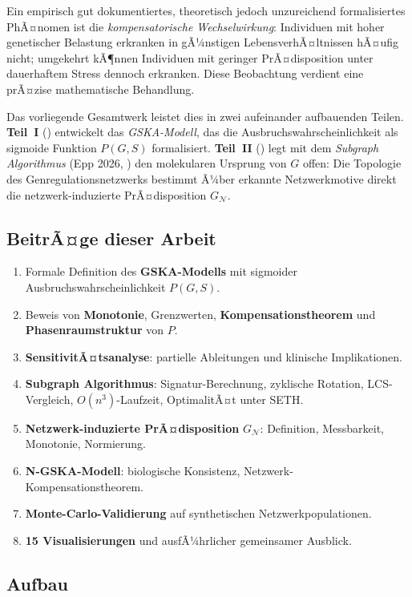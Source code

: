 ﻿\documentclass[12pt, a4paper]{article}
\theoremstyle{definition}
\theoremstyle{remark}
\newcommand{\calN}{\mathcal{N}}
\newcommand{\GN}{G_{\calN}}
\begin{document}
Ein empirisch gut dokumentiertes, theoretisch jedoch unzureichend formalisiertes
PhÃ¤nomen ist die \emph{kompensatorische Wechselwirkung}: Individuen mit hoher
genetischer Belastung erkranken in gÃ¼nstigen LebensverhÃ¤ltnissen hÃ¤ufig nicht;
umgekehrt kÃ¶nnen Individuen mit geringer PrÃ¤disposition unter dauerhaftem Stress
dennoch erkranken. Diese Beobachtung verdient eine prÃ¤zise mathematische Behandlung.

Das vorliegende Gesamtwerk leistet dies in zwei aufeinander aufbauenden Teilen.
\textbf{Teil~I} () entwickelt das \emph{GSKA-Modell}, das die
Ausbruchswahrscheinlichkeit als sigmoide Funktion $P(G,S)$ formalisiert.
\textbf{Teil~II} () legt mit dem \emph{Subgraph Algorithmus}
(Epp 2026, \cite{epp2026sub}) den molekularen Ursprung von $G$ offen: Die
Topologie des Genregulationsnetzwerks bestimmt Ã¼ber erkannte Netzwerkmotive
direkt die netzwerk-induzierte PrÃ¤disposition $\GN$.

\subsection{BeitrÃ¤ge dieser Arbeit}

\begin{enumerate}[label=(\roman*)]
  \item Formale Definition des \textbf{GSKA-Modells} mit sigmoider
    Ausbruchswahrscheinlichkeit $P(G,S)$.
  \item Beweis von \textbf{Monotonie}, Grenzwerten, \textbf{Kompensationstheorem}
    und \textbf{Phasenraumstruktur} von $P$.
  \item \textbf{SensitivitÃ¤tsanalyse}: partielle Ableitungen und klinische
    Implikationen.
  \item \textbf{Subgraph Algorithmus}: Signatur-Berechnung, zyklische Rotation,
    LCS-Vergleich, $O(n^3)$-Laufzeit, OptimalitÃ¤t unter SETH.
  \item \textbf{Netzwerk-induzierte PrÃ¤disposition} $\GN$: Definition,
    Messbarkeit, Monotonie, Normierung.
  \item \textbf{N-GSKA-Modell}: biologische Konsistenz, Netzwerk-Kompensationstheorem.
  \item \textbf{Monte-Carlo-Validierung} auf synthetischen Netzwerkpopulationen.
  \item \textbf{15 Visualisierungen} und ausfÃ¼hrlicher gemeinsamer Ausblick.
\end{enumerate}

\subsection{Aufbau}
\end{document}
